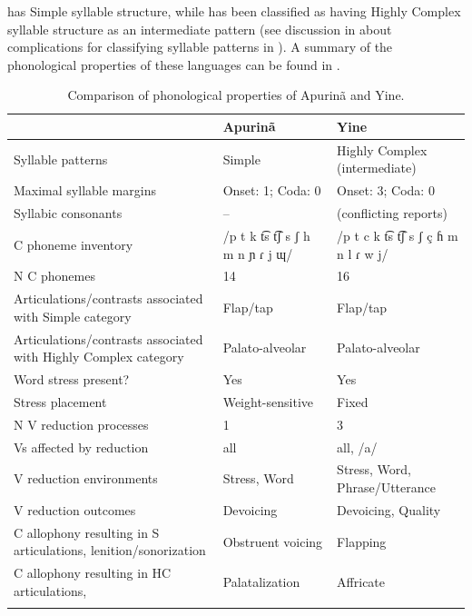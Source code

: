    has Simple syllable structure, while  has been classified as having Highly Complex syllable structure as an intermediate pattern (see discussion in  about complications for classifying syllable patterns in ). A summary of the phonological properties of these languages can be found in .

\begin{table}
\begin{tabularx}{\textwidth}{Qp{3cm}p{3cm}}
\lsptoprule
 & {Apurinã} & {Yine}\\
 \midrule 
 {Syllable patterns} & Simple & Highly Complex (intermediate)\\
 \tablevspace
 {Maximal syllable margins} & Onset: 1; Coda: 0 & Onset: 3; Coda: 0\\
 \tablevspace
 {Syllabic consonants} & -- & (conflicting reports)\\
 \tablevspace
 {C phoneme inventory} & /p t k t͡s t͡ʃ s ʃ h m n ɲ ɾ j ɰ/ & /p t c k t͡s t͡ʃ s ʃ ç ɦ m n l ɾ w j/\\
 \tablevspace
 {N C phonemes} & 14 & 16\\
 \tablevspace
 {Articulations/contrasts associated with {Simple}} {category} & {Flap/tap} & {Flap/tap}\\
 \tablevspace
 {Articulations/contrasts associated with {Highly Complex}} {category} & { {Palato-alveolar}} & { {Palato-alveolar}}\\
 \tablevspace
 {Word stress present?} & {Yes} & {Yes}\\
 \tablevspace
 {Stress placement} & {Weight-sensitive} & {Fixed}\\
 \tablevspace
 {N V reduction processes} & {1} & {3}\\
 \tablevspace
 {Vs affected by reduction}  & {all} & {all, /a/}\\
 \tablevspace
 {V reduction environments} & {Stress, Word} & {Stress, Word, Phrase/Utterance}\\
 \tablevspace
 {V reduction outcomes} & {Devoicing} & {Devoicing, Quality}\\
 \tablevspace
 {C allophony resulting in S articulations, lenition/sonorization} & {Obstruent voicing} & { {Flapping}}\\
 \tablevspace
 {{C allophony resulting in HC articulations,} } & {Palatalization} & { {Affricate}}\\
\lspbottomrule
\end{tabularx}
\caption{\label{tab:8.3}Comparison of phonological properties of Apurinã and Yine.}
\end{table}

